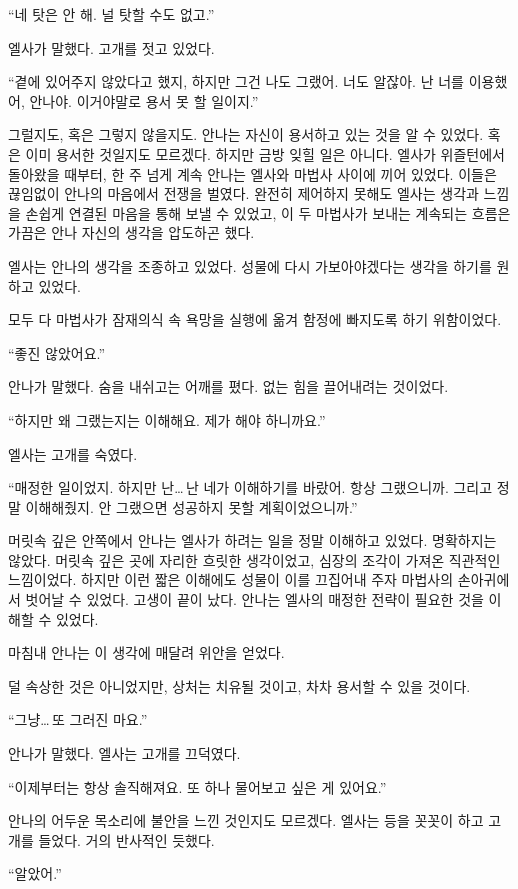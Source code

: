 ``네 탓은 안 해. 널 탓할 수도 없고.''

엘사가 말했다. 고개를 젓고 있었다.

``곁에 있어주지 않았다고 했지, 하지만 그건 나도 그랬어. 너도 알잖아. 난 너를 이용했어, 안나야. 이거야말로 용서 못 할 일이지.''

그럴지도, 혹은 그렇지 않을지도. 안나는 자신이 용서하고 있는 것을 알 수 있었다. 혹은 이미 용서한 것일지도 모르겠다. 하지만 금방 잊힐 일은 아니다. 엘사가 위즐턴에서 돌아왔을 때부터, 한 주 넘게 계속 안나는 엘사와 마법사 사이에 끼어 있었다. 이들은 끊임없이 안나의 마음에서 전쟁을 벌였다. 완전히 제어하지 못해도 엘사는 생각과 느낌을 손쉽게 연결된 마음을 통해 보낼 수 있었고, 이 두 마법사가 보내는 계속되는 흐름은 가끔은 안나 자신의 생각을 압도하곤 했다.

엘사는 안나의 생각을 조종하고 있었다. 성물에 다시 가보아야겠다는 생각을 하기를 원하고 있었다.

모두 다 마법사가 잠재의식 속 욕망을 실행에 옮겨 함정에 빠지도록 하기 위함이었다.

``좋진 않았어요.''

안나가 말했다. 숨을 내쉬고는 어깨를 폈다. 없는 힘을 끌어내려는 것이었다.

``하지만 왜 그랬는지는 이해해요. 제가 해야 하니까요.''

엘사는 고개를 숙였다.

``매정한 일이었지. 하지만 난\ldots\,난 네가 이해하기를 바랐어. 항상 그랬으니까. 그리고 정말 이해해줬지. 안 그랬으면 성공하지 못할 계획이었으니까.''

머릿속 깊은 안쪽에서 안나는 엘사가 하려는 일을 정말 이해하고 있었다. 명확하지는 않았다. 머릿속 깊은 곳에 자리한 흐릿한 생각이었고, 심장의 조각이 가져온 직관적인 느낌이었다. 하지만 이런 짧은 이해에도 성물이 이를 끄집어내 주자 마법사의 손아귀에서 벗어날 수 있었다. 고생이 끝이 났다. 안나는 엘사의 매정한 전략이 필요한 것을 이해할 수 있었다.

마침내 안나는 이 생각에 매달려 위안을 얻었다.

덜 속상한 것은 아니었지만, 상처는 치유될 것이고, 차차 용서할 수 있을 것이다.

``그냥\ldots\,또 그러진 마요.''

안나가 말했다. 엘사는 고개를 끄덕였다.

``이제부터는 항상 솔직해져요. 또 하나 물어보고 싶은 게 있어요.''

안나의 어두운 목소리에 불안을 느낀 것인지도 모르겠다. 엘사는 등을 꼿꼿이 하고 고개를 들었다. 거의 반사적인 듯했다.

``알았어.''

